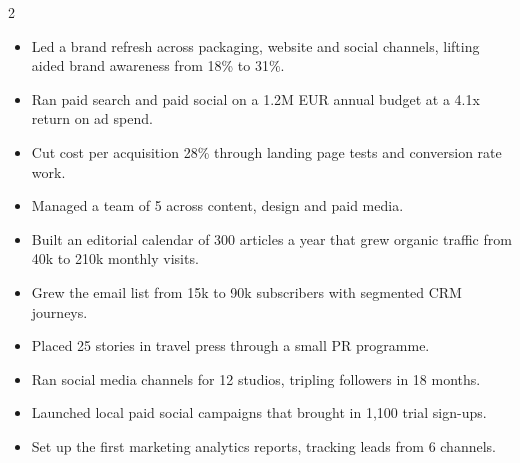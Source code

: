 \documentclass[10pt,a4paper,withhyper]{altacv}
\begin{document}


\makecvheader


\begin{paracol}{2}

\begin{itemize}
\item Led a brand refresh across packaging, website and social channels, lifting aided brand awareness from 18\% to 31\%. %
\item Ran paid search and paid social on a 1.2M EUR annual budget at a 4.1x return on ad spend. %
\item Cut cost per acquisition 28\% through landing page tests and conversion rate work. %
\item Managed a team of 5 across content, design and paid media. %
\end{itemize}

\divider

\begin{itemize}
\item Built an editorial calendar of 300 articles a year that grew organic traffic from 40k to 210k monthly visits. %
\item Grew the email list from 15k to 90k subscribers with segmented CRM journeys. %
\item Placed 25 stories in travel press through a small PR programme. %
\end{itemize}

\divider

\begin{itemize}
\item Ran social media channels for 12 studios, tripling followers in 18 months. %
\item Launched local paid social campaigns that brought in 1,100 trial sign-ups. %
\item Set up the first marketing analytics reports, tracking leads from 6 channels. %
\end{itemize}


\end{paracol}
\end{document}
